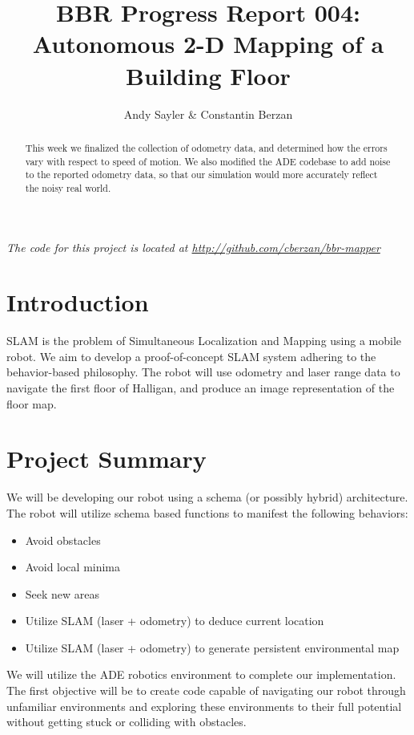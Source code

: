 \documentclass[12pt]{article}
\begin{document}
\title{BBR Progress Report 004:\\ Autonomous 2-D Mapping of a Building Floor}
\author{Andy Sayler \& Constantin Berzan}
\maketitle

\begin{abstract}
This week we finalized the collection of odometry data, and determined how the
errors vary with respect to speed of motion. We also modified the ADE codebase
to add noise to the reported odometry data, so that our simulation would more
accurately reflect the noisy real world.
\end{abstract}

\emph{The code for this project is located at
\url{http://github.com/cberzan/bbr-mapper}}

\section{Introduction}
SLAM is the problem of Simultaneous Localization and Mapping using a mobile
robot.  We aim to develop a proof-of-concept SLAM system adhering to the
behavior-based philosophy.  The robot will use odometry and laser range data to
navigate the first floor of Halligan, and produce an image representation of
the floor map.


\section{Project Summary}

We will be developing our robot using a schema (or possibly hybrid)
architecture. The robot will utilize schema based functions to manifest the
following behaviors:

\begin{itemize}
    \setlength{\itemsep}{0pt}
    \setlength{\parskip}{0pt}
    \setlength{\parsep}{0pt}
    \item Avoid obstacles
    \item Avoid local minima
    \item Seek new areas
    \item Utilize SLAM (laser + odometry) to deduce current location
    \item Utilize SLAM (laser + odometry) to generate persistent environmental
          map
\end{itemize}

We will utilize the ADE robotics environment to complete our implementation.
The first objective will be to create code capable of navigating our robot
through unfamiliar environments and exploring these environments to their full
potential without getting stuck or colliding with obstacles. 
\end{document}
